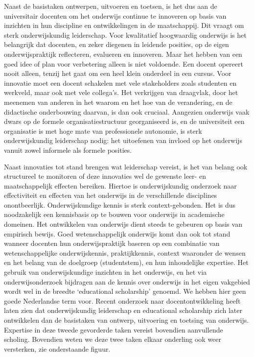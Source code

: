 \documentclass[empirical, authordate, ]{new-jote-article}
\begin{document}
	Naast de basistaken ontwerpen, uitvoeren en toetsen, is het dus aan de universitair docenten om het onderwijs continue te innoveren op basis van inzichten in hun discipline en ontwikkelingen in de maatschappij. Dit vraagt om sterk onderwijskundig leiderschap. Voor kwalitatief hoogwaardig onderwijs is het belangrijk dat docenten, en zeker diegenen in leidende posities, op de eigen onderwijspraktijk reflecteren, evalueren en innoveren. Maar het hebben van een goed idee of plan voor verbetering alleen is niet voldoende. Een docent opereert nooit alleen, tenzij het gaat om een heel klein onderdeel in een cursus. Voor innovatie moet een docent schakelen met vele stakeholders zoals studenten en werkveld, maar ook met vele collega's. Het verkrijgen van draagvlak, door het meenemen van anderen in het waarom en het hoe van de verandering, en de didactische onderbouwing daarvan, is dan ook cruciaal. Aangezien onderwijs vaak dwars op de formele organisatiestructuur georganiseerd is, en de universiteit een organisatie is met hoge mate van professionele autonomie, is sterk onderwijskundig leiderschap nodig: het uitoefenen van invloed op het onderwijs vanuit zowel informele als formele posities.



	Naast innovaties tot stand brengen wat leiderschap vereist, is het van belang ook structureel te monitoren of deze innovaties wel de gewenste leer- en maatschappelijk effecten bereiken. Hiertoe is onderwijskundig onderzoek naar effectiviteit en effecten van het onderwijs in de verschillende disciplines onontbeerlijk. Onderwijskundige kennis is sterk context-gebonden. Het is dus noodzakelijk een kennisbasis op te bouwen voor onderwijs in academische domeinen. Het ontwikkelen van onderwijs dient steeds te gebeuren op basis van empirisch bewijs. Goed wetenschappelijk onderwijs komt dan ook tot stand wanneer docenten hun onderwijspraktijk baseren op een combinatie van wetenschappelijke onderwijskennis, praktijkkennis, context waaronder de wensen en het belang van de doelgroep (studentstem), en hun inhoudelijke expertise. Het gebruik van onderwijskundige inzichten in het onderwijs, en het via onderwijsonderzoek bijdragen aan de kennis over onderwijs in het eigen vakgebied wordt wel in de breedte ‘educational scholarship' genoemd. We hebben hier geen goede Nederlandse term voor. Recent onderzoek naar docentontwikkeling heeft laten zien dat onderwijskundig leiderschap en educational scholarship zich later ontwikkelen dan de basistaken van ontwerp, uitvoering en toetsing van onderwijs. Expertise in deze tweede gevorderde taken vereist bovendien aanvullende scholing. Bovendien weten we deze twee taken elkaar onderling ook weer versterken, zie onderstaande figuur.
\end{document}
